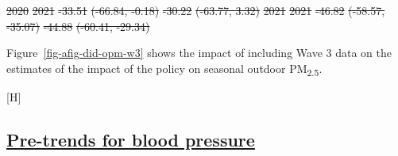 \documentclass[
  letterpaper,
  DIV=11,
  numbers=noendperiod]{scrartcl}
\makeatletter
\renewenvironment{figure}%
   {\renewcommand\familydefault\sfdefault
    \@float{figure}}
   {\end@float}
\providecommand{\DIFadd}[1]{{\protect\color{blue}\underline{#1}}} %
\providecommand{\DIFdel}[1]{{\protect\color{red}\sout{#1}}}                      %
\providecommand{\DIFaddbegin}{} %
\providecommand{\DIFaddend}{} %
\providecommand{\DIFdelbegin}{} %
\providecommand{\DIFdelend}{} %
\providecommand{\DIFdelFL}[1]{\DIFdel{#1}} %
\providecommand{\DIFaddbeginFL}{} %
\providecommand{\DIFaddendFL}{} %
\providecommand{\DIFdelbeginFL}{} %
\providecommand{\DIFdelendFL}{} %
\newcommand{\DIFscaledelfig}{0.5}
\newlength{\DIFdelgraphicswidth} %
\newlength{\DIFdelgraphicsheight} %
\newcommand{\DIFaddincludegraphics}[2][]{{\color{blue}\fbox{\DIFOincludegraphics[#1]{#2}}}} %
\newcommand{\DIFdelincludegraphics}[2][]{%
\sbox{\DIFdelgraphicsbox}{\DIFOincludegraphics[#1]{#2}}%
\settoboxwidth{\DIFdelgraphicswidth}{\DIFdelgraphicsbox} %
\settoboxtotalheight{\DIFdelgraphicsheight}{\DIFdelgraphicsbox} %
\scalebox{\DIFscaledelfig}{%
\parbox[b]{\DIFdelgraphicswidth}{\usebox{\DIFdelgraphicsbox}\\[-\baselineskip] \rule{\DIFdelgraphicswidth}{0em}}\llap{\resizebox{\DIFdelgraphicswidth}{\DIFdelgraphicsheight}{%
\setlength{\unitlength}{\DIFdelgraphicswidth}%
\begin{picture}(1,1)%
\thicklines\linethickness{2pt} %
{\color[rgb]{1,0,0}\put(0,0){\framebox(1,1){}}}%
{\color[rgb]{1,0,0}\put(0,0){\line( 1,1){1}}}%
{\color[rgb]{1,0,0}\put(0,1){\line(1,-1){1}}}%
\end{picture}%
}\hspace*{3pt}}} %
} %
\DeclareRobustCommand{\DIFaddbegin}{\DIFOaddbegin \let\includegraphics\DIFaddincludegraphics} %
\DeclareRobustCommand{\DIFaddend}{\DIFOaddend \let\includegraphics\DIFOincludegraphics} %
\DeclareRobustCommand{\DIFdelbegin}{\DIFOdelbegin \let\includegraphics\DIFdelincludegraphics} %
\DeclareRobustCommand{\DIFdelend}{\DIFOaddend \let\includegraphics\DIFOincludegraphics} %
\DeclareRobustCommand{\DIFaddbeginFL}{\DIFOaddbeginFL \let\includegraphics\DIFaddincludegraphics} %
\DeclareRobustCommand{\DIFaddendFL}{\DIFOaddendFL \let\includegraphics\DIFOincludegraphics} %
\DeclareRobustCommand{\DIFdelbeginFL}{\DIFOdelbeginFL \let\includegraphics\DIFdelincludegraphics} %
\DeclareRobustCommand{\DIFdelendFL}{\DIFOaddendFL \let\includegraphics\DIFOincludegraphics} %
\makeatother
\begin{document}
\DIFdelFL{2020 }%
\DIFdelFL{2021 }%
\DIFdelFL{-33.51 }%
\DIFdelFL{(-66.84, -0.18) }%
\DIFdelFL{-30.22 }%
\DIFdelFL{(-63.77, 3.32)}%
\DIFdelFL{2021 }%
\DIFdelFL{2021 }%
\DIFdelFL{-46.82 }%
\DIFdelFL{(-58.57, -35.07) }%
\DIFdelFL{-44.88 }%
\DIFdelFL{(-60.41, -29.34)}%

\DIFdelend Figure~\ref{fig-afig-did-opm-w3} shows the impact of including Wave 3
data on the estimates of the impact of the policy on seasonal outdoor
PM\textsubscript{2.5}.

\begin{figure}[H]

\DIFdelbeginFL %


\DIFdelendFL \caption{\label{fig-afig-did-opm-w3}Effects of the CBHP policy on
outdoor seasonal PM\textsubscript{2.5} based on whether Season 3 data
are included vs.~excluded.}

\DIFaddbeginFL {}

\DIFaddendFL \end{figure}%

\newpage

\DIFdelbegin %
\DIFdelend \DIFaddbegin \subsection{\DIFadd{Pre-trends for blood
pressure}}\label{pre-trends-for-blood-pressure}
\DIFaddend 
\end{document}
